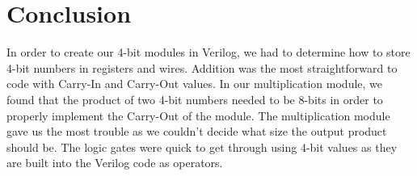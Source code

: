 \documentclass[
	letterpaper, %
	10pt, %
]{CSUniSchoolLabReport}
\begin{document}
\section{Conclusion}
In order to create our 4-bit modules in Verilog, we had to determine how to store 4-bit numbers in registers and wires. Addition was the most straightforward to code with Carry-In and Carry-Out values.  In our multiplication module, we found that the product of two 4-bit numbers needed to be 8-bits in order to properly implement the Carry-Out of the module. The multiplication module gave us the most trouble as we couldn’t decide what size the output product should be. The logic gates were quick to get through using 4-bit values as they are built into the Verilog code as operators.


\end{document}
